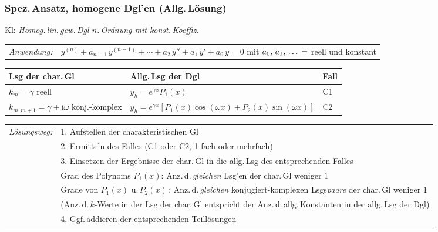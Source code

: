 \documentclass[a4paper,10pt,titlepage]{scrartcl}
\begin{document}
\subsubsection*{Spez.\,Ansatz, homogene Dgl'en (Allg.\,Lösung)}
Kl: \emph{Homog.\,lin.\,gew.\,Dgl $n$.\,Ordnung mit konst.\,Koeffiz.}
\smallskip\\
\begin{tabular}{ll}
 \emph{Anwendung:} & $y^{(n)}+a_{n-1}\,y^{(n-1)}+\cdots+a_2\,y''+a_1\,y'+a_0\,y=0$ \quad mit \quad $a_0,\,a_1,\,\text{\dots}=$ reell und konstant\\
\end{tabular}
\begin{center}
\begin{tabular}{l|l|l}
 Lsg der char.\,Gl & Allg.\,Lsg der Dgl & Fall\\ \hline
 $k_m=\gamma$ \hspace{1.69cm} reell                        & $y_h=e^{\gamma x} P_1(x)$                                                & C1
 \\
 $k_{m,m+1}=\gamma\pm\mathrm{i}\omega$ \quad konj.-komplex & $y_h=e^{\gamma x}[P_1(x)\cos(\omega x)+P_2(x)\sin(\omega x)]$ & C2
 \\
\end{tabular}
\end{center}
\begin{tabular}{ll}
 \emph{Lösungsweg:}
 & 1. Aufstellen der charakteristischen Gl\\
 & 2. Ermitteln des Falles (C1 oder C2, 1-fach oder mehrfach)\\
 & 3. Einsetzen der Ergebnisse der char.\,Gl in die allg.\,Lsg des entsprechenden Falles\\
 & \quad Grad des Polynoms $P_1(x)$: Anz.\,d.\,\emph{gleichen} Lsg'en der char.\,Gl weniger $1$\\
 & \quad Grade von $P_1(x)$ u.\,$P_2(x)$\,: Anz.\,d.\,\emph{gleichen} konjugiert-komplexen Lsgs\emph{paare} der char.\,Gl weniger $1$\\
 & \quad (Anz.\,d.\,$k$-Werte in der Lsg der char.\,Gl entspricht der Anz.\,d.\,allg.\,Konstanten in der allg.\,Lsg der Dgl)\\
 & 4. Ggf.\,addieren der entsprechenden Teillösungen\\
\end{tabular}
\end{document}
